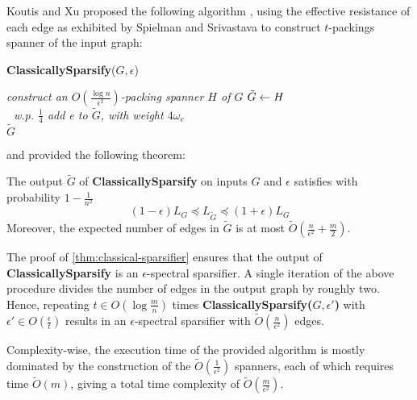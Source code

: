 
Koutis and Xu proposed the following algorithm \cite{koutis_simple_2016},
using the effective resistance of each edge as exhibited by Spielman and
Srivastava to construct $t$-packings spanner of the input graph:
\begin{algorithm}[H]
    \caption{\textbf{ClassicallySparsify}($G,
    \epsilon$)}\label{alg:classical-sparsify}
    \begin{algorithmic}[1]
    \State \textit{construct an $O(\frac{\log n}{\epsilon ^2})$-packing spanner
    $H$ of $G$}
    \State $\tilde{G} \leftarrow H $  \\
    \textit{$\;$ w.p. $\frac{1}{4}$ add e to $\tilde{G}$, with weight
    $4\omega_e$} \EndFor \\
    \Return $\tilde{G}$
    \end{algorithmic}
\end{algorithm}
and provided the following theorem:
\begin{theorem}\label{thm:classical-sparsifier} The output
    $\tilde{G}$ of \textbf{ClassicallySparsify} on inputs $G$ and $\epsilon$
    satisfies with probability $1 - \frac{1}{n^2}$
    \begin{equation*}
        (1 - \epsilon) L_G \preccurlyeq L_{\tilde{G}} \preccurlyeq (1 + \epsilon) L_G
    \end{equation*}
    Moreover, the expected number of edges in $\tilde{G}$ is at most
    $\tilde{O}(\frac{n}{\epsilon ^2} + \frac{m}{2})$.
\end{theorem}

The proof of \autoref{thm:classical-sparsifier}
\cite{koutis_simple_2016} ensures that the output of
\textbf{ClassicallySparsify} is an $\epsilon$-spectral sparsifier. A single
iteration of the above procedure divides the number of edges in the output graph
by roughly two. Hence, repeating $ t \in O(\log \frac{m}{n})$ times
\textbf{ClassicallySparsify($G, \epsilon'$)} with $\epsilon' \in
O(\frac{\epsilon}{t}) $ results in an $\epsilon$-spectral sparsifier with
$\tilde{O}(\frac{n}{\epsilon ^2})$ edges.

Complexity-wise, the execution time of the provided algorithm is mostly
dominated by the construction of the $\tilde{O}(\frac{1}{\epsilon^2})$ spanners,
each of which requires time $\tilde{O}(m)$, giving a total time complexity of
$\tilde{O}(\frac{m}{\epsilon^2})$.